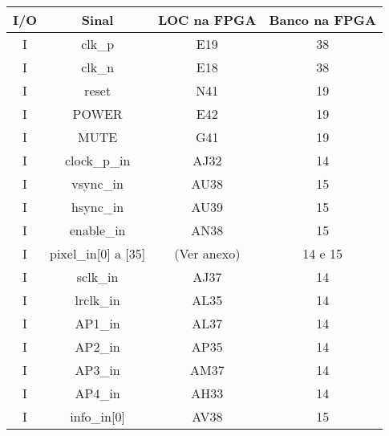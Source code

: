 \begin{longtable}[h!]
	{|c|c|c|c|}

		\hline
		\centering
\textbf{I/O} & \textbf{Sinal}               & \textbf{LOC na FPGA} & \textbf{Banco na FPGA} \\ \hline \endhead
I            & clk\_p                       & E19                  & 38                     \\ \hline
I            & clk\_n                       & E18                  & 38                     \\ \hline
I            & reset                        & N41                  & 19                     \\ \hline
I            & POWER                        & E42                  & 19                     \\ \hline
I            & MUTE                         & G41                  & 19                     \\ \hline
I            & clock\_p\_in                 & AJ32                 & 14                     \\ \hline
I            & vsync\_in                    & AU38                 & 15                     \\ \hline
I            & hsync\_in                    & AU39                 & 15                     \\ \hline
I            & enable\_in                   & AN38                 & 15                     \\ \hline
I            & pixel\_in{[}0{]} a {[}35{]}  & (Ver anexo)          & 14 e 15                \\ \hline
I            & sclk\_in                     & AJ37                 & 14                     \\ \hline
I            & lrclk\_in                    & AL35                 & 14                     \\ \hline
I            & AP1\_in                      & AL37                 & 14                     \\ \hline
I            & AP2\_in                      & AP35                 & 14                     \\ \hline
I            & AP3\_in                      & AM37                 & 14                     \\ \hline
I            & AP4\_in                      & AH33                 & 14                     \\ \hline
I            & info\_in{[}0{]}              & AV38                 & 15                     \\ \hline

\end{longtable}
